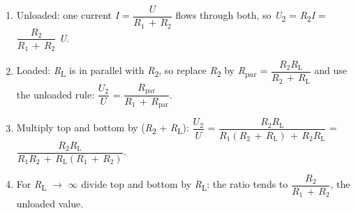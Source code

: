 \documentclass[11pt]{article}
\begin{document}
\begin{keepsection}
\begin{keepsection}
\begin{enumerate}
\item Unloaded: one current \textit{I} = {\small\ensuremath{\dfrac{{U}}{{R}_{1}\, +\, {R}_{2}}}} flows through both, so \textit{U}\textsubscript{2} = \textit{R}\textsubscript{2}\textit{I} = {\small\ensuremath{\dfrac{{R}_{2}}{{R}_{1}\, +\, {R}_{2}}}} \textit{U}.
\item Loaded: \textit{R}\textsubscript{L} is in parallel with \textit{R}\textsubscript{2}, so replace \textit{R}\textsubscript{2} by \textit{R}\textsubscript{par} = {\small\ensuremath{\dfrac{{R}_{2}{R}_{\mathrm{L}}}{{R}_{2}\, +\, {R}_{\mathrm{L}}}}} and use the unloaded rule: {\small\ensuremath{\dfrac{{U}_{2}}{{U}}}} = {\small\ensuremath{\dfrac{{R}_{\text{par}}}{{R}_{1}\, +\, {R}_{\text{par}}}}}.
\item Multiply top and bottom by (\textit{R}\textsubscript{2} + \textit{R}\textsubscript{L}): {\small\ensuremath{\dfrac{{U}_{2}}{{U}}}} = {\small\ensuremath{\dfrac{{R}_{2}{R}_{\mathrm{L}}}{{R}_{1}({R}_{2}\, +\, {R}_{\mathrm{L}})\, +\, {R}_{2}{R}_{\mathrm{L}}}}} = {\small\ensuremath{\dfrac{{R}_{2}{R}_{\mathrm{L}}}{{R}_{1}{R}_{2}\, +\, {R}_{\mathrm{L}}({R}_{1}\, +\, {R}_{2})}}}.
\item For \textit{R}\textsubscript{L} \ensuremath{\to} \ensuremath{\infty} divide top and bottom by \textit{R}\textsubscript{L}: the ratio tends to {\small\ensuremath{\dfrac{{R}_{2}}{{R}_{1}\, +\, {R}_{2}}}}, the unloaded value.
\end{enumerate}


\end{keepsection}
\end{keepsection}
\end{document}
